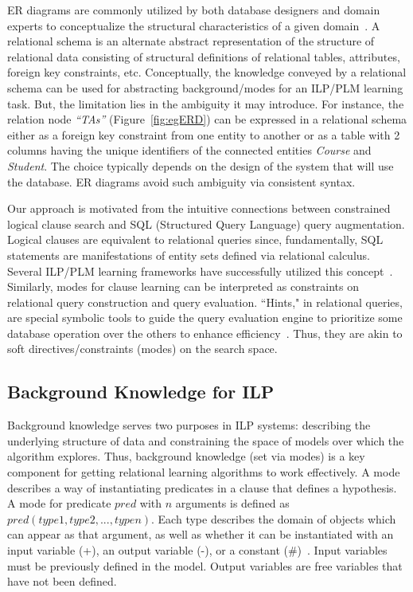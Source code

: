 \documentclass[sigconf]{acmart}
\begin{document}
ER diagrams are commonly utilized by both database designers and domain experts to conceptualize the structural characteristics of a given domain~\cite{garcia2009database}. A relational schema is an alternate abstract representation of the structure of relational data consisting of structural definitions of relational tables, attributes, foreign key constraints, etc. Conceptually, the knowledge conveyed by a relational schema can be used for abstracting background/modes for an ILP/PLM learning task. But, the limitation lies in the ambiguity it may introduce. For instance, the relation node \textit{``TAs''} (Figure~\ref{fig:egERD}) can be expressed in a relational schema either as a foreign key constraint from one entity to another or as a table with 2 columns having the unique identifiers of the connected entities \textit{Course} and \textit{Student}. The choice typically depends on the design of the system that will use the database. ER diagrams avoid such ambiguity via consistent syntax.

Our approach is motivated from the intuitive connections between constrained logical clause search and SQL (Structured Query Language) query augmentation.
Logical clauses are equivalent to relational queries since, fundamentally, SQL statements are manifestations of entity sets defined via relational calculus. Several ILP/PLM learning frameworks have successfully utilized this concept~\cite{niuvldb11,malec2016inductive}. Similarly, modes for clause learning can be interpreted as constraints on relational query construction and query evaluation.  ``Hints," in relational queries, are special symbolic tools to guide the query evaluation engine to prioritize some database operation over the others to enhance efficiency~\cite{lohman2000relational,diab2009search,bruno2012flexible}. Thus, they are akin to soft directives/constraints (modes) on the search space.

\subsection{Background Knowledge for ILP}

Background knowledge serves two purposes in ILP systems: describing the underlying structure of data and constraining the space of models over which the algorithm  explores. Thus, background knowledge (set via modes) is a key component for getting relational learning algorithms to work effectively. A mode describes a way of instantiating predicates in a clause that defines a hypothesis. A mode for predicate $pred$ with $n$ arguments is defined as $pred(type1,type2,...,typen)$. Each type describes the domain of objects which can appear as that argument, as well as whether it can be instantiated with an input variable (+), an output variable (-), or a constant (\#)~\cite{aleph}. Input variables must be previously defined in the model. Output variables are free variables that have not been defined.
\end{document}
